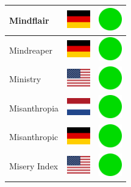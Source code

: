 \documentclass[12pt, a4paper, twoside]{report}
\begin{document}
\begin{center}
\begin{longtable}{|p{5cm}|p{2cm}|p{2cm}|}
 Mindflair                                                  & \includegraphics[width=1cm]{../img/flags/de} &   \includegraphics[width=1cm]{../likes/y} \\ \hline
 Mindreaper                                                 & \includegraphics[width=1cm]{../img/flags/de} &   \includegraphics[width=1cm]{../likes/y} \\ \hline
 Ministry                                                   & \includegraphics[width=1cm]{../img/flags/us} &   \includegraphics[width=1cm]{../likes/y} \\ \hline
 Misanthropia                                               & \includegraphics[width=1cm]{../img/flags/nl} &   \includegraphics[width=1cm]{../likes/y} \\ \hline
 Misanthropic                                               & \includegraphics[width=1cm]{../img/flags/de} &   \includegraphics[width=1cm]{../likes/y} \\ \hline
 Misery Index                                               & \includegraphics[width=1cm]{../img/flags/us} &   \includegraphics[width=1cm]{../likes/y} \\ \hline

\end{longtable}
\end{center}
\end{document}
